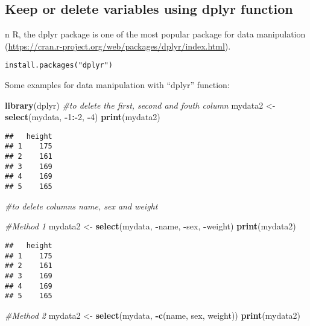 \documentclass[]{book}
\newenvironment{Shaded}{\begin{snugshade}}{\end{snugshade}}
\newcommand{\KeywordTok}[1]{\textcolor[rgb]{0.13,0.29,0.53}{\textbf{#1}}}
\newcommand{\DecValTok}[1]{\textcolor[rgb]{0.00,0.00,0.81}{#1}}
\newcommand{\StringTok}[1]{\textcolor[rgb]{0.31,0.60,0.02}{#1}}
\newcommand{\CommentTok}[1]{\textcolor[rgb]{0.56,0.35,0.01}{\textit{#1}}}
\newcommand{\OperatorTok}[1]{\textcolor[rgb]{0.81,0.36,0.00}{\textbf{#1}}}
\newcommand{\NormalTok}[1]{#1}
\theoremstyle{definition}
\theoremstyle{definition}
\theoremstyle{definition}
\theoremstyle{remark}
\begin{document}
\subsection{Keep or delete variables using dplyr
function}\label{keep-or-delete-variables-using-dplyr-function}

n R, the dplyr package is one of the most popular package for data
manipulation
(\url{https://cran.r-project.org/web/packages/dplyr/index.html}).

\begin{verbatim}
install.packages("dplyr")
\end{verbatim}

Some examples for data manipulation with ``dplyr'' function:

\begin{Shaded}
\begin{Highlighting}[]
\KeywordTok{library}\NormalTok{(dplyr)}
\CommentTok{#to delete the first, second and fouth column}
\NormalTok{mydata2 <-}\StringTok{ }\KeywordTok{select}\NormalTok{(mydata, }\OperatorTok{-}\DecValTok{1}\OperatorTok{:-}\DecValTok{2}\NormalTok{, }\OperatorTok{-}\DecValTok{4}\NormalTok{)}
\KeywordTok{print}\NormalTok{(mydata2)}
\end{Highlighting}
\end{Shaded}

\begin{verbatim}
##   height
## 1    175
## 2    161
## 3    169
## 4    169
## 5    165
\end{verbatim}

\begin{Shaded}
\begin{Highlighting}[]
\CommentTok{#to delete columns name, sex and weight}

\CommentTok{#Method 1}
\NormalTok{mydata2 <-}\StringTok{ }\KeywordTok{select}\NormalTok{(mydata, }\OperatorTok{-}\NormalTok{name, }\OperatorTok{-}\NormalTok{sex, }\OperatorTok{-}\NormalTok{weight)}
\KeywordTok{print}\NormalTok{(mydata2)}
\end{Highlighting}
\end{Shaded}

\begin{verbatim}
##   height
## 1    175
## 2    161
## 3    169
## 4    169
## 5    165
\end{verbatim}

\begin{Shaded}
\begin{Highlighting}[]
\CommentTok{#Method 2}
\NormalTok{mydata2 <-}\StringTok{ }\KeywordTok{select}\NormalTok{(mydata, }\OperatorTok{-}\KeywordTok{c}\NormalTok{(name, sex, weight))}
\KeywordTok{print}\NormalTok{(mydata2)}
\end{Highlighting}
\end{Shaded}
\end{document}
